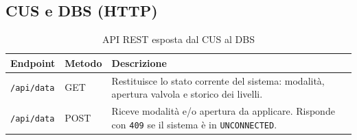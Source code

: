 \documentclass[a4paper,12pt]{report}
\begin{document}
\subsection{CUS e DBS (HTTP)}
\begin{table}[H]
	\centering
	\small
	\begin{tabularx}{\textwidth}{|l|p{3cm}|X|}
		\hline
		\textbf{Endpoint} & \textbf{Metodo} & \textbf{Descrizione} \\
		\hline
		\texttt{/api/data} & GET & Restituisce lo stato corrente del sistema: modalità, apertura valvola e storico dei livelli. \\
		\hline
		\texttt{/api/data} & POST & Riceve modalità e/o apertura da applicare. Risponde con \texttt{409} se il sistema è in \texttt{UNCONNECTED}. \\
		\hline
	\end{tabularx}
	\caption{API REST esposta dal CUS al DBS}
\end{table}
\end{document}
